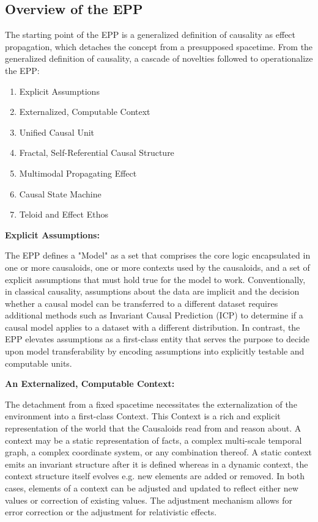 \subsection{Overview of the EPP}
\label{sec:epp_overview}

The starting point of the EPP is a generalized definition of causality as effect propagation, which detaches the concept from a presupposed spacetime. From the generalized definition of causality, a cascade of novelties followed to operationalize the EPP:

\begin{enumerate}
	\item Explicit Assumptions 
	\item Externalized, Computable Context
	\item Unified Causal Unit
	\item Fractal, Self-Referential Causal Structure
	\item Multimodal Propagating Effect
	\item Causal State Machine 
	\item Teloid and Effect Ethos
\end{enumerate}


\textbf{Explicit Assumptions:}

The EPP defines a "Model" as a set that comprises the core logic encapsulated in one or more causaloids, one or more contexts used by the causaloids, and a set of explicit assumptions that must hold true for the model to work. Conventionally, in classical causality, assumptions about the data are  implicit and the decision whether a causal model can be transferred to a different dataset requires additional methods such as Invariant Causal Prediction (ICP) to determine if a causal model applies to a dataset with a different distribution. In contrast, the EPP elevates assumptions as a first-class entity that serves the purpose to decide upon model transferability by encoding assumptions into explicitly testable and computable units. 

\textbf{An Externalized, Computable Context:} 

The detachment from a fixed spacetime necessitates the externalization of the environment into a first-class Context. This Context is a rich and explicit representation of the world that the Causaloids read from and reason about. A context may be a static representation of facts, a complex multi-scale temporal graph, a complex coordinate system, or any combination thereof. A static context emits an invariant structure after it is defined whereas in a dynamic context, the context structure itself evolves e.g. new elements are added or removed. In both cases, elements of a context can be adjusted and updated to reflect either new values or correction of existing values. The adjustment mechanism allows for error correction or the adjustment for relativistic effects.   

